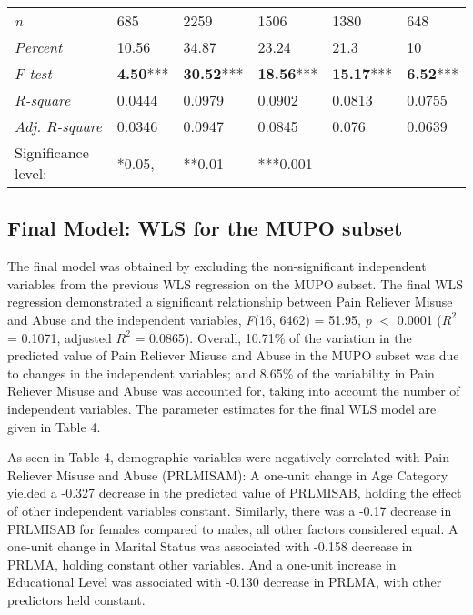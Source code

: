 \documentclass[sigconf]{acmart}
\begin{document}
\begin{table*}[ht]
\begin{tabular}{llllll}
    \midrule
    \textit{n}       & 685& 2259& 1506&  1380& 648 \\
    \textit{Percent} & 10.56& 34.87& 23.24& 21.3& 10 \\
    \textit{F-test}  & \textbf{4.50}*** & \textbf{30.52}***& \textbf{18.56}***& \textbf{15.17}***& \textbf{6.52}***  \\ 
    \textit{R-square}& 0.0444& 0.0979& 0.0902& 0.0813& 0.0755 \\ 
    \textit{Adj. R-square}& 0.0346 & 0.0947& 0.0845& 0.076& 0.0639 \\
    \bottomrule
    Significance level:&  *0.05,& **0.01& ***0.001&
  \end{tabular}
\end{table*}


\subsection{Final Model: WLS for the MUPO subset}

The final model was obtained by excluding the non-significant independent 
variables from the previous WLS regression on the MUPO subset. The final WLS 
regression demonstrated a significant relationship between Pain Reliever Misuse 
and Abuse and the independent variables, \textit{F}(16, 6462) = 51.95, 
\textit{p} $<$ 0.0001 ($R^2$ = 0.1071, adjusted $R^2$ = 0.0865). Overall, 
10.71\% of the variation in the predicted value of Pain Reliever Misuse and 
Abuse in the MUPO subset was due to changes in the independent variables; 
and 8.65\% of the variability in Pain Reliever Misuse and Abuse was accounted 
for, taking into account the number of independent variables. The parameter 
estimates for the final WLS model are given in Table 4. 

As seen in Table 4, demographic variables were negatively correlated with Pain 
Reliever Misuse and Abuse (PRLMISAM): A one-unit change in Age Category yielded a 
-0.327 decrease in the predicted value of PRLMISAB, holding the effect of other 
independent variables constant. Similarly, there was a -0.17 decrease in PRLMISAB 
for females compared to males, all other factors considered equal. A one-unit 
change in Marital Status was associated with -0.158 decrease in PRLMA, holding
constant other variables. And a one-unit increase in Educational Level was 
associated with -0.130 decrease in PRLMA, with other predictors held constant. 
\end{document}
